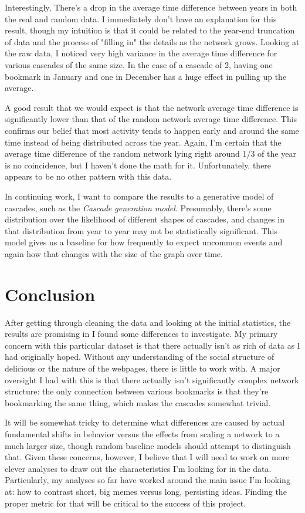 \documentclass[11pt]{amsart}
\begin{document}
Interestingly, There's a drop in the average time difference between years in both the real and random data. I immediately don't have an explanation for this result, though my intuition is that it could be related to the year-end truncation of data and the process of "filling in" the details as the network grows. Looking at the raw data, I noticed very high variance in the average time difference for various cascades of the same size. In the case of a cascade of 2, having one bookmark in January and one in December has a huge effect in pulling up the average.

A good result that we would expect is that the network average time difference is significantly lower than that of the random network average time difference. This confirms our belief that most activity tends to happen early and around the same time instead of being distributed across the year. Again, I'm certain that the average time difference of the random network lying right around 1/3 of the year is no coincidence, but I haven't done the math for it. Unfortunately, there appears to be no other pattern with this data.

In continuing work, I want to compare the results to a generative model of cascades, such as the \textit{Cascade generation model}\cite{cascade}. Presumably, there's some distribution over the likelihood of different shapes of cascades, and changes in that distribution from year to year may not be statistically significant. This model gives us a baseline for how frequently to expect uncommon events and again how that changes with the size of the graph over time.

\section{Conclusion}
After getting through cleaning the data and looking at the initial statistics, the results are promising in I found some differences to investigate. My primary concern with this particular dataset is that there actually isn't as rich of data as I had originally hoped. Without any understanding of the social structure of delicious or the nature of the webpages, there is little to work with. A major oversight I had with this is that there actually isn't significantly complex network structure: the only connection between various bookmarks is that they're bookmarking the same thing, which makes the cascades somewhat trivial.

It will be somewhat tricky to determine what differences are caused by actual fundamental shifts in behavior versus the effects from scaling a network to a much larger size, though random baseline models should attempt to distinguish that. Given these concerns, however, I believe that I will need to work on more clever analyses to draw out the characteristics I'm looking for in the data. Particularly, my analyses so far have worked around the main issue I'm looking at: how to contrast short, big memes versus long, persisting ideas. Finding the proper metric for that will be critical to the success of this project.



\end{document}
